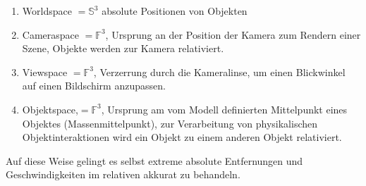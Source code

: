 \begin{enumerate}
\item Worldspace $= \mathbb{S}^3$ absolute Positionen von Objekten
\item Cameraspace $= \mathbb{F}^3$, Ursprung an der Position der Kamera zum Rendern einer Szene, Objekte werden zur Kamera relativiert.
\item Viewspace $= \mathbb{F}^3$, Verzerrung durch die Kameralinse, um einen Blickwinkel auf einen Bildschirm anzupassen.
\item Objektspace,$= \mathbb{F}^3$, Ursprung am vom Modell definierten Mittelpunkt eines Objektes (Massenmittelpunkt), zur Verarbeitung von physikalischen Objektinteraktionen wird ein Objekt zu einem anderen Objekt relativiert.
\end{enumerate}

Auf diese Weise gelingt es selbst extreme absolute Entfernungen und Geschwindigkeiten im relativen akkurat zu behandeln.


